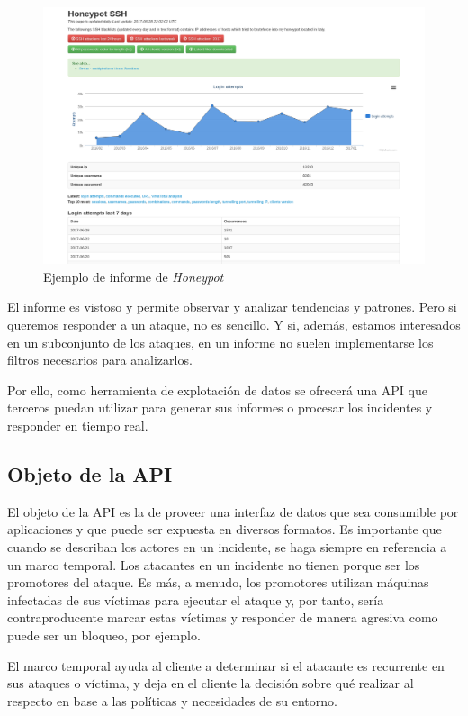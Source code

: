 \begin{figure}[h]
    \centering
      \includegraphics[scale=0.3]{images/honeypot_informe}
    \caption{Ejemplo de informe de \emph{Honeypot}}
    \label{fig:informe-honeypot}
  \end{figure}

El informe es vistoso y permite observar y analizar tendencias y patrones. Pero si queremos responder a un ataque, no es sencillo. Y si, además, estamos interesados en un subconjunto de los ataques,
en un informe no suelen implementarse los filtros necesarios para analizarlos.

Por ello, como herramienta de explotación de datos se ofrecerá una API que terceros puedan utilizar para generar sus informes o procesar los incidentes y responder
en tiempo real.

\subsection{Objeto de la API}

El objeto de la API es la de proveer una interfaz de datos que sea consumible por aplicaciones y que puede ser expuesta en diversos formatos.
Es importante que cuando se describan los actores en un incidente, se haga siempre en referencia a un marco temporal. Los atacantes
en un incidente no tienen porque ser los promotores del ataque. Es más, a menudo, los promotores utilizan máquinas infectadas de sus víctimas para ejecutar el ataque
y, por tanto, sería contraproducente marcar estas víctimas y responder de manera agresiva como puede ser un bloqueo, por ejemplo.

El marco temporal ayuda al cliente a determinar si el atacante es recurrente en sus ataques o víctima, y deja en el cliente la decisión sobre qué realizar al respecto en base a 
las políticas y necesidades de su entorno.

